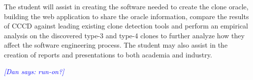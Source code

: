 \documentclass{article}
\newcommand{\dan}[1]{\textcolor{blue}{{\it [Dan says: #1]}}}
\begin{document}
The student will assist in creating the software needed to create the clone oracle, building the web application to share the oracle information, compare the results of CCCD against leading existing clone detection tools and perform an empirical analysis on the discovered type-3 and type-4 clones to further analyze how they affect the software engineering process. The student may also assist in the creation of reports and presentations to both academia and industry.

\dan{run-on?}





















%


\end{document}

